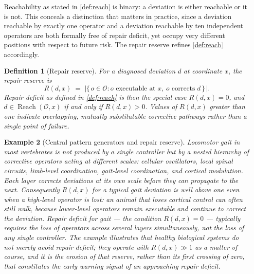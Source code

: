 \documentclass[12pt]{report}
\newtheorem{definition}{Definition}[section]
\newtheorem{example}[definition]{Example}
\begin{document}
Reachability as stated in \cref{def:reach} is binary: a deviation is
either reachable or it is not. This conceals a distinction that matters
in practice, since a deviation reachable by exactly one operator and a
deviation reachable by ten independent operators are both formally free
of repair deficit, yet occupy very different positions with respect to
future risk. The repair reserve refines \cref{def:reach} accordingly.

\begin{definition}[Repair reserve]
\label{def:reserve}
For a diagnosed deviation $d$ at coordinate $x$, the repair reserve is
\[
R(d,x) \;=\; \bigl|\{\, o \in \mathcal{O} : o \text{ executable at } x,\ o \text{ corrects } d \,\}\bigr|.
\]
Repair deficit as defined in \cref{def:reach} is then the special case
$R(d,x) = 0$, and $d \in \operatorname{Reach}(\mathcal{O},x)$ if and only
if $R(d,x) > 0$. Values of $R(d,x)$ greater than one indicate overlapping,
mutually substitutable corrective pathways rather than a single point of
failure.
\end{definition}

\begin{example}[Central pattern generators and repair reserve]
\label{ex:cpg}
Locomotor gait in most vertebrates is not produced by a single controller
but by a nested hierarchy of corrective operators acting at different
scales: cellular oscillators, local spinal circuits, limb-level
coordination, gait-level coordination, and cortical modulation. Each layer
corrects deviations at its own scale before they can propagate to the
next. Consequently $R(d,x)$ for a typical gait deviation is well above
one even when a high-level operator is lost: an animal that loses
cortical control can often still walk, because lower-level operators
remain executable and continue to correct the deviation. Repair deficit
for gait --- the condition $R(d,x) = 0$ --- typically requires the loss
of operators across several layers simultaneously, not the loss of any
single controller. The example illustrates that healthy biological
systems do not merely avoid repair deficit; they operate with
$R(d,x) \gg 1$ as a matter of course, and it is the erosion of that
reserve, rather than its first crossing of zero, that constitutes the
early warning signal of an approaching repair deficit.
\end{example}
\end{document}
